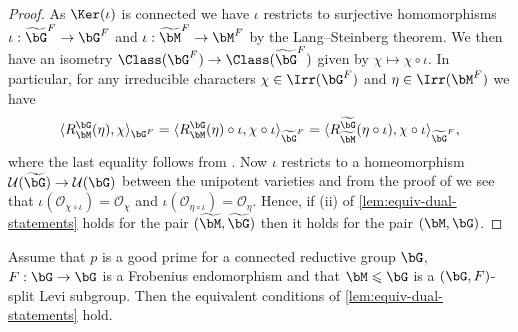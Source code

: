 \documentclass[eqthmnum,nocolour,skinny]{jt-calcs}
\begin{document}
\begin{proof}
As $\Ker(\iota)$ is connected we have $\iota$ restricts to surjective homomorphisms $\iota : \widetilde{\bG}^F \to \bG^F$ and $\iota : \widetilde{\bM}^F \to \bM^F$ by the Lang--Steinberg theorem. We then have an isometry $\Class(\bG^F) \to \Class(\widetilde{\bG}^F)$ given by $\chi \mapsto \chi \circ \iota$. In particular, for any irreducible characters $\chi \in \Irr(\bG^F)$ and $\eta \in \Irr(\bM^F)$ we have
\begin{equation*}
\langle R_{\bM}^{\bG}(\eta),\chi\rangle_{\bG^F} = \langle R_{\bM}^{\bG}(\eta)\circ\iota,\chi\circ\iota\rangle_{\widetilde{\bG}^F} = \langle R_{\widetilde{\bM}}^{\widetilde{\bG}}(\eta\circ \iota),\chi\circ\iota\rangle_{\widetilde{\bG}^F},
\end{equation*}
where the last equality follows from \cite[13.22]{digne-michel:1991:representations-of-finite-groups-of-lie-type}. Now $\iota$ restricts to a homeomorphism $\mathcal{U}(\widetilde{\bG}) \to \mathcal{U}(\bG)$ between the unipotent varieties and from the proof of \cite[Lem.~5.2]{geck:1996:on-the-average-values} we see that $\iota(\mathcal{O}_{\chi\circ\iota}) = \mathcal{O}_{\chi}$ and $\iota(\mathcal{O}_{\eta\circ\iota}) = \mathcal{O}_{\eta}$. Hence, if (ii) of \cref{lem:equiv-dual-statements} holds for the pair $(\widetilde{\bM},\widetilde{\bG})$ then it holds for the pair $(\bM,\bG)$.
\end{proof}

\begin{thm}\label{thm:BLST}
Assume that $p$ is a good prime for a connected reductive group $\bG$, $F : \bG \to \bG$ is a Frobenius endomorphism and that $\bM \leqslant \bG$ is a $(\bG,F)$-split Levi subgroup. Then the equivalent conditions of \cref{lem:equiv-dual-statements} hold.
\end{thm}
\end{document}
